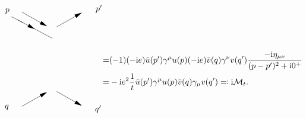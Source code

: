 \begin{equation}
\begin{gathered}
\begin{tikzpicture}[x=0.75pt,y=0.75pt,yscale=-1,xscale=1]
            \draw    (119.94,84.35) -- (176.27,114.35) ;
            \draw [shift={(148.1,99.35)}, rotate = 208.04] [fill={rgb, 255:red, 0; green, 0; blue, 0 }  ][line width=0.08]  [draw opacity=0] (12,-3) -- (0,0) -- (12,3) -- cycle    ;
            \draw    (129.52,89.35) -- (110.35,79.35) ;
            
            \draw    (127.06,223.94) -- (165.99,201.92) ;
            \draw [shift={(167.73,200.94)}, rotate = 150.51] [fill={rgb, 255:red, 0; green, 0; blue, 0 }  ][line width=0.08]  [draw opacity=0] (12,-3) -- (0,0) -- (12,3) -- cycle    ;
            \draw    (221.99,221.95) -- (183.06,199.94) ;
            \draw [shift={(223.73,222.94)}, rotate = 209.49] [fill={rgb, 255:red, 0; green, 0; blue, 0 }  ][line width=0.08]  [draw opacity=0] (12,-3) -- (0,0) -- (12,3) -- cycle    ;
            \draw    (221.99,73.92) -- (183.06,95.94) ;
            \draw [shift={(223.73,72.94)}, rotate = 150.51] [fill={rgb, 255:red, 0; green, 0; blue, 0 }  ][line width=0.08]  [draw opacity=0] (12,-3) -- (0,0) -- (12,3) -- cycle    ;
            \draw    (127.06,71.94) -- (165.99,93.95) ;
            \draw [shift={(167.73,94.94)}, rotate = 209.49] [fill={rgb, 255:red, 0; green, 0; blue, 0 }  ][line width=0.08]  [draw opacity=0] (12,-3) -- (0,0) -- (12,3) -- cycle    ;
            
            \draw (107.35,220.34) node [anchor=north east] [inner sep=0.75pt]    {$q$};
            \draw (243.65,220.75) node [anchor=north west][inner sep=0.75pt]    {$q'$};
            \draw (108.35,75.95) node [anchor=south east] [inner sep=0.75pt]    {$p$};
            \draw (244.65,74.54) node [anchor=south west] [inner sep=0.75pt]    {$p'$};
            \end{tikzpicture}            
    \end{gathered} \begin{aligned}[t]
        =& (-1) (- \ii e) \bar{u}(p') \gamma^\mu u(p) (- \ii e) \bar{v}(q) \gamma^\nu v(q') \frac{- \ii \eta_{\mu \nu}}{(p-p')^2 + \ii 0^+} \\
        =& - \ii e^2 \frac{1}{t} \bar{u}(p') \gamma^\mu u(p) \bar{v}(q) \gamma_\mu v(q') \eqqcolon \ii \mathcal{M}_t.
    \end{aligned}
    \label{eq:t-channel}
\end{equation}